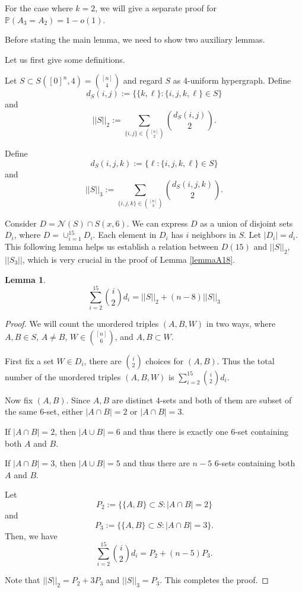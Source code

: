 \documentclass[reqno,11pt]{amsart}
\newtheorem{lemma}[theorem]{Lemma}
\begin{document}
For the case where $k=2$, we will give a separate proof for $\mathbb{P}(A_3 = A_2) = 1 - o(1)$. 

Before stating the main lemma, we need to show two auxiliary lemmas. 

Let us first give some definitions.

Let $S \subset S([0]^n,4)=\binom{[n]}{4}$ and regard $S$ as 4-uniform hypergraph. Define $$d_S(i,j):=\{\{k,\ell\}:\{i,j,k,\ell\} \in S\}$$
and 
$$||S||_2:=\sum_{\{i,j\} \in \binom{[n]}{2}}\binom{d_S(i,j)}{2}.$$

Define 
$$d_S(i,j,k):=\{\ell:\{i,j,k,\ell\} \in S\}$$
and
$$||S||_3:=\sum_{\{i,j,k\} \in \binom{[n]}{3}}\binom{d_S(i,j,k)}{2}.$$

Consider $D=\mathcal{N}(S) \cap S(x,6)$. We can express $D$ as a union of disjoint sets $D_i$, where $D = \cup_{i=1}^{15} D_i$. Each element in $D_i$ has $i$ neighbors in $S$. Let $|D_i|=d_i$. This following lemma helps us establish a relation between $D(15)$ and $||S||_2$, $||S_3||$, which is very crucial in the proof of Lemma \ref{lemmaA18}. 

\begin{lemma} \label{lemma:S_2,S_3}
$$\sum_{i=2}^{15}\binom{i}{2}d_i=||S||_2 +(n-8)||S||_3$$
\end{lemma}
\begin{proof}
We will count the unordered triples $(A,B,W)$ in two ways, where $A,B \in S$, $A \neq B$, $W \in \binom{[n]}{6}$, and $A,B \subset W$. 

First fix a set $W \in D_i$, there are $\binom{i}{2}$ choices for $(A,B)$. Thus the total number of the unordered triples $(A,B,W)$ is $\sum_{i=2}^{15}\binom{i}{2}d_i$. 

Now fix $(A,B)$. Since $A,B$ are distinct $4$-sets and both of them are subset of the same $6$-set, either $|A \cap B|=2$ or $|A \cap B|=3$. 

If $|A \cap B|=2$, then $|A \cup B|=6$ and thus there is exactly one $6$-set containing both $A$ and $B$. 

If $|A \cap B|=3$, then $|A \cup B|=5$ and thus there are $n-5$ 6-sets containing both $A$ and $B$. 

Let $$P_2:=\{\{A,B\} \subset S:|A\cap B|=2\}$$ and 
$$P_3:=\{\{A,B\} \subset S: |A\cap B|=3\}.$$
Then, we have 
$$\sum_{i=2}^{15}\binom{i}{2}d_i=P_2 +(n-5)P_3.$$

Note that $||S||_2=P_2+3P_3$ and $||S||_3=P_3$. This completes the proof.
\end{proof}
\end{document}
